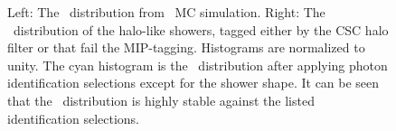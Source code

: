 \begin{figure}[htbp]
  \centering
  \caption{
    Left: The \phig\ distribution from \zinvg\ MC simulation. \qquad \qquad
    Right: The \phig\ distribution of the halo-like showers, tagged either by the CSC halo filter or that fail the MIP-tagging.
    Histograms are normalized to unity.
    The cyan histogram is the \phig\ distribution after applying photon identification selections except for the shower shape. 
    It can be seen that the \phig\ distribution is highly stable against the listed identification selections.
  }
  \label{fig:halophi}
\end{figure}

